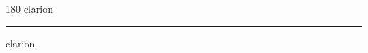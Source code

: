 
\begin{frame}
\begin{center}
\begin{turn}{180}
{\fontsize{2.5cm}{1em}\selectfont clarion}
\end{turn}
\vspace{1em}\par  
\hrule
\vspace{1em}\par  
{\fontsize{2.5cm}{1em}\selectfont clarion}
\end{center}
\end{frame}
